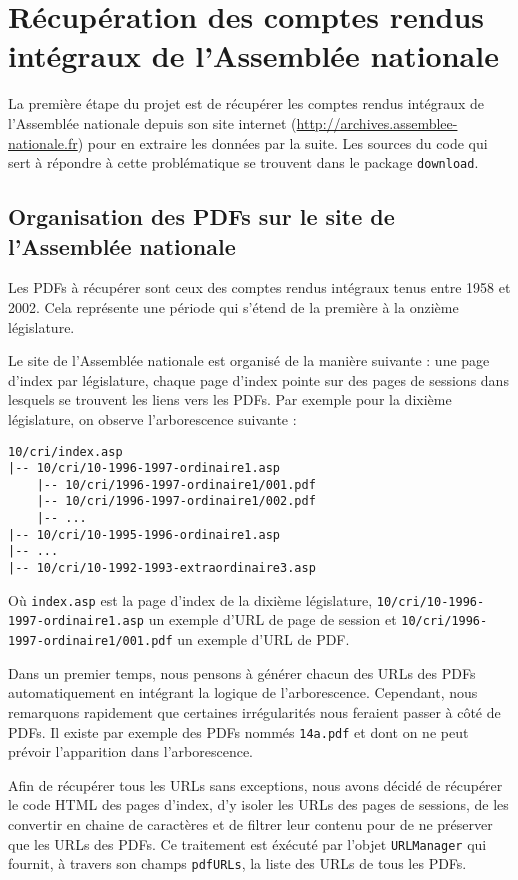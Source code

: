 \section[Récupération des comptes rendus intégraux]{Récupération des comptes rendus intégraux de l'Assemblée nationale}

La première étape du projet est de récupérer les comptes rendus intégraux de l'Assemblée nationale depuis son site internet (\url{http://archives.assemblee-nationale.fr}) pour en extraire les données par la suite. Les sources du code qui sert à répondre à cette problématique se trouvent dans le package \verb|download|.

\subsection{Organisation des PDFs sur le site de l'Assemblée nationale}

Les PDFs à récupérer sont ceux des comptes rendus intégraux tenus entre 1958 et 2002. Cela représente une période qui s'étend de la première à la onzième législature.

Le site de l'Assemblée nationale est organisé de la manière suivante : une page d'index par législature, chaque page d'index pointe sur des pages de sessions dans lesquels se trouvent les liens vers les PDFs. Par exemple pour la dixième législature, on observe l'arborescence suivante :
\begin{verbatim}
10/cri/index.asp
|-- 10/cri/10-1996-1997-ordinaire1.asp
    |-- 10/cri/1996-1997-ordinaire1/001.pdf
    |-- 10/cri/1996-1997-ordinaire1/002.pdf
    |-- ...
|-- 10/cri/10-1995-1996-ordinaire1.asp
|-- ...
|-- 10/cri/10-1992-1993-extraordinaire3.asp
\end{verbatim}
Où \verb|index.asp| est la page d'index de la dixième législature, \verb|10/cri/10-1996-1997-ordinaire1.asp| un exemple d'URL de page de session et \verb|10/cri/1996-1997-ordinaire1/001.pdf| un exemple d'URL de PDF.

Dans un premier temps, nous pensons à générer chacun des URLs des PDFs automatiquement en intégrant la logique de l'arborescence. Cependant, nous remarquons rapidement que certaines irrégularités nous feraient passer à côté de PDFs. Il existe par exemple des PDFs nommés \verb|14a.pdf| et dont on ne peut prévoir l'apparition dans l'arborescence.

Afin de récupérer tous les URLs sans exceptions, nous avons décidé de récupérer le code HTML des pages d'index, d'y isoler les URLs des pages de sessions, de les convertir en chaine de caractères et de filtrer leur contenu pour de ne préserver que les URLs des PDFs. Ce traitement est éxécuté par l'objet \verb|URLManager| qui fournit, à travers son champs \verb|pdfURLs|, la liste des URLs de tous les PDFs.

